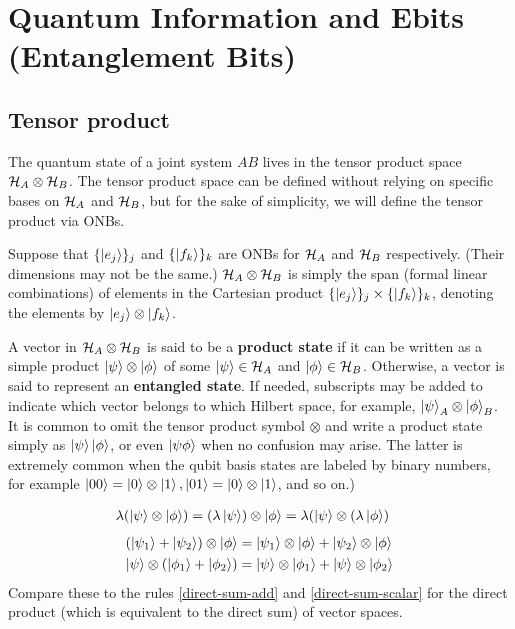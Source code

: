 \section{Quantum Information and Ebits (Entanglement Bits)}

\subsection{Tensor product}

The quantum state of a joint system $AB$ lives in the tensor product space $\mathcal{H}_A\otimes \mathcal{H}_B$. The tensor product space can be defined without relying on specific bases on $\mathcal{H}_A$ and $\mathcal{H}_B$, but for the sake of simplicity, we will define the tensor product  via ONBs.

Suppose that $\{\ket{e_j}\}_j$ and $\{\ket{f_k}\}_k$ are ONBs for $\mathcal{H}_A$ and $\mathcal{H}_B$ respectively. (Their dimensions may not be the same.) $\mathcal{H}_A\otimes \mathcal{H}_B$ is simply the span (formal linear combinations) of elements in the Cartesian product $\{\ket{e_j}\}_j \times \{\ket{f_k}\}_k$, denoting the elements by $\ket{e_j}\otimes \ket{f_k}$.

A vector in $\mathcal{H}_A\otimes\mathcal{H}_B$ is said to be a {\bf product state} if it can be written as a simple product $\ket{\psi}\otimes\ket{\phi}$ of some $\ket{\psi}\in\mathcal{H}_A$ and $\ket{\phi}\in\mathcal{H}_B$. Otherwise, a vector is said to represent an {\bf entangled state}.
If needed, subscripts may be added to indicate which vector belongs to which Hilbert space, for example, $\ket{\psi}_A \otimes \ket{\phi}_B$. 
It is common to omit the tensor product symbol $\otimes$ and write a product state simply as $\ket{\psi}\ket{\phi}$, or even $\ket{\psi\phi}$ when no confusion may arise. The latter is extremely common when the qubit basis states are labeled by binary numbers, for example $\ket{00} = \ket{0}\otimes\ket{1}, \ket{01}=\ket{0}\otimes\ket{1}$, and so on.)
 
\vspace{0.5em}
\begin{align}
	\lambda(\ket{\psi}\otimes\ket{\phi}) &= 
	(\lambda\ket{\psi})\otimes\ket{\phi} =
	\lambda(\ket{\psi}\otimes(\lambda\ket{\phi}) 
\end{align}
\vspace{0.5em}
\begin{align}
	(\ket{\psi_1} + \ket{\psi_2}) \otimes \ket{\phi} &= \ket{\psi_1} \otimes \ket{\phi} +  \ket{\psi_2} \otimes \ket{\phi} \\
\ket{\psi}\otimes(\ket{\phi_1} + \ket{\phi_2}) &= \ket{\psi}\otimes \ket{\phi_1}  + \ket{\psi}\otimes  \ket{\phi_2}	
\end{align}
Compare these to the rules \ref{direct-sum-add} and \ref{direct-sum-scalar} for the direct product (which is equivalent to the direct sum) of vector spaces.

